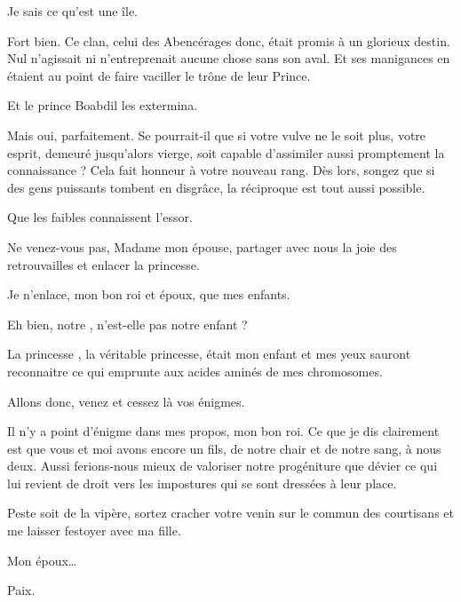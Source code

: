 \begin{drama}
  \elaspeaks {} Je sais ce qu’est une île.

  \elenaspeaks Fort bien.
  Ce clan, celui des Abencérages donc, était promis à un glorieux destin. Nul n’agissait ni n’entreprenait aucune chose sans son aval. Et ses manigances en étaient au point de faire vaciller le trône de leur Prince.

  \elaspeaks Et le prince Boabdil les extermina.

  \elenaspeaks Mais oui, parfaitement.  Se pourrait-il que si votre vulve ne le soit plus, votre esprit, demeuré jusqu’alors vierge, soit capable d’assimiler aussi promptement la connaissance ? Cela  fait honneur à votre nouveau rang. Dès lors, songez que si des gens puissants tombent en disgrâce, la réciproque est tout aussi possible.


  \elaspeaks Que les faibles connaissent l’essor.

\end{drama}


\scene

\StageDirII{\roi, \reine, \ela}




\begin{drama}
  \roispeaks {} Ne venez-vous pas, Madame mon épouse, partager avec nous la joie des retrouvailles et enlacer la princesse.

  \reinespeaks Je n’enlace, mon bon roi et époux, que mes enfants.

  \roispeaks Eh bien, notre \princesse{}, n’est-elle pas notre enfant ?

  \reinespeaks La princesse \princesse{}, la véritable princesse, était mon enfant et mes yeux sauront reconnaitre ce qui emprunte aux acides aminés de mes chromosomes. %

  \roispeaks{} Allons donc, venez et cessez là vos énigmes.

  \reinespeaks Il n’y a point d’énigme dans mes propos, mon bon roi. Ce que je dis clairement est que vous et moi avons encore un fils, de notre chair et de notre sang, à nous deux. Aussi ferions-nous mieux de valoriser notre progéniture que dévier ce qui lui revient de droit vers les impostures qui se sont dressées à leur place.

  \roispeaks Peste soit de la vipère, sortez cracher votre venin sur le commun des courtisans et me laisser festoyer avec ma fille.

  \reinespeaks Mon époux…

  \roispeaks {} Paix.
\end{drama}


